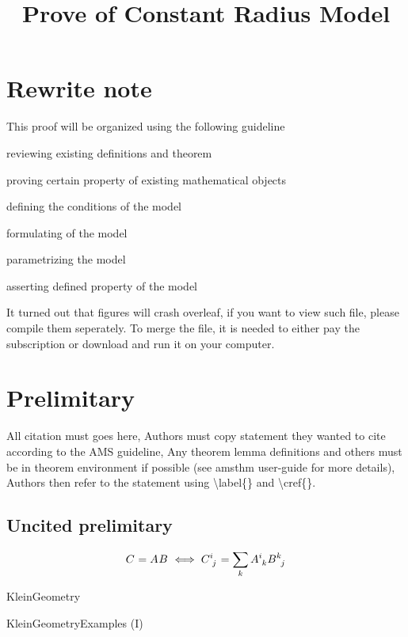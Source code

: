 \documentclass[stu, babel, american, biblatex, a4paper, draftall]{apa7}
\title{Prove of Constant Radius Model}
\begin{document}
\maketitle
\tableofcontents

\section{Rewrite note}
This proof will be organized using the following guideline
\begin{APAenumerate}
    \item reviewing existing definitions and theorem
    \item proving certain property of existing mathematical objects
    \item defining the conditions of the model
    \item formulating of the model
    \item parametrizing the model
    \item asserting defined property of the model
\end{APAenumerate}
It turned out that figures will crash overleaf, if you want to view such file, please compile them seperately.
To merge the file, it is needed to either pay the subscription or download and run it on your computer.

\section{Prelimitary}
All citation must goes here,
Authors must copy statement they wanted to cite according to the AMS guideline,
Any theorem lemma definitions and others must be in theorem environment if possible (see amsthm user-guide for more details),
Authors then refer to the statement using {\textbackslash}label\{\} and {\textbackslash}cref\{\}.
\subsection{Uncited prelimitary}
\begin{equation}\label{MatrixMultiplication}
    \tensor{C}{}=\tensor{A}{}\tensor{B}{}
    \iff
    \tensor{C}{^i_j}=\sum_k\tensor{A}{^i_k}\tensor{B}{^k_j}
\end{equation}
\begin{definition}\label{KleinGeometry}
    KleinGeometry
\end{definition}
\begin{example}\label{KleinGeometryExample}
    KleinGeometryExamples (I)
\end{example}
\end{document}

